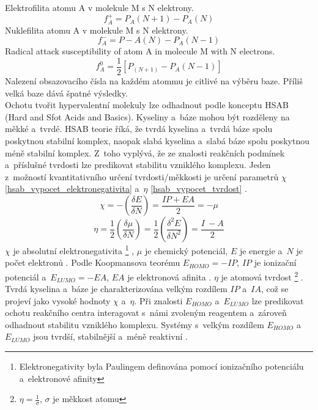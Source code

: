\documentclass[
  digital, %
  table,   %
  lof,     %
  lot,     %
  oneside,
]{fithesis3}
\begin{document}
Elektrofilita atomu A v molekule M s N elektrony.
\begin{equation}
f_A^+ = P_A(N+1) - P_A(N)
\end{equation}
Nuklefilita atomu A v molekule M s N elektrony.
\begin{equation}
f_A^- = P-A(N) - P_A(N-1)
\end{equation}
Radical attack susceptibility of atom A in molecule M with N electrons.
\begin{equation}
f_A^0 = \frac{1}{2}[P_(N+1) - P_A(N-1)]
\end{equation}
Nalezení obsazovacího čísla na každém atommu je citlivé na výběru baze. Příliš velká baze dává špatné výsledky.\\

Ochotu tvořit hypervalentní molekuly lze odhadnout podle konceptu HSAB (Hard and Sfot Acids and Basics). Kyseliny a~báze mohou být rozděleny na měkké a~tvrdé. HSAB teorie říká, že tvrdá kyselina a~tvrdá báze spolu poskytnou stabilní komplex, naopak slabá kyselina a~slabá báze spolu poskytnou méně stabilní komplex. Z~toho vyplývá, že ze znalosti reakčních podmínek a~příslušné tvrdosti lze predikovat stabilitu vzniklého komplexu. Jeden z~možností kvantitativního určení tvrdosti/měkkosti je určení parametrů $\chi$ \ref{hsab_vypocet_elektronegativita} a~$\eta$ \ref{hsab_vypocet_tvrdost} \cite{hsabclanek}.
\begin{equation}
\chi = - \left( \frac{\delta E}{\delta N} \right) = \frac{IP + EA}{2} = -\mu
\label{hsab_vypocet_elektronegativita}
\end{equation}
\begin{equation}
\eta = \frac{1}{2} \left( \frac{\delta \mu}{\delta N} \right) = \frac{1}{2}\left( \frac{\delta^2 E}{\delta N^2} \right) = \frac{I~- A}{2}
\label{hsab_vypocet_tvrdost}
\end{equation}
$\chi$ je absolutní elektronegativita  \footnote{Elektronegativity byla Paulingem definována pomocí ionizačního potenciálu a~elektronové afinity} , $\mu$ je chemický potenciál, $E$ je energie a~$N$ je počet elektronů \cite{hsabwatoc}. Podle Koopmansova teorému $E_{HOMO} = - IP$, $IP$ je ionizační potenciál a~$E_{LUMO} = -EA$, $EA$ je elektronová afinita \cite{kratochvilexcerpta}. $\eta$ je atomová tvrdost \footnote{$\eta = \frac{1}{\sigma}$, $\sigma$ je měkkost atomu} \cite{pearson1986absolute}. Tvrdá kyselina a~báze je charakterizována velkým rozdílem $IP$ a~$IA$, což se projeví jako vysoké hodnoty $\chi$ a~$\eta$. Při znalosti $E_{HOMO}$ a~$E_{LUMO}$ lze predikovat ochotu reakčního centra interagovat s~námi zvoleným reagentem a~zároveň odhadnout stabilitu vzniklého komplexu. Systémy s~velkým rozdílem $E_{HOMO}$ a~$E_{LUMO}$ jsou tvrdší, stabilnější a~méně reaktivní \cite{hsabwatoc}.
\end{document}
